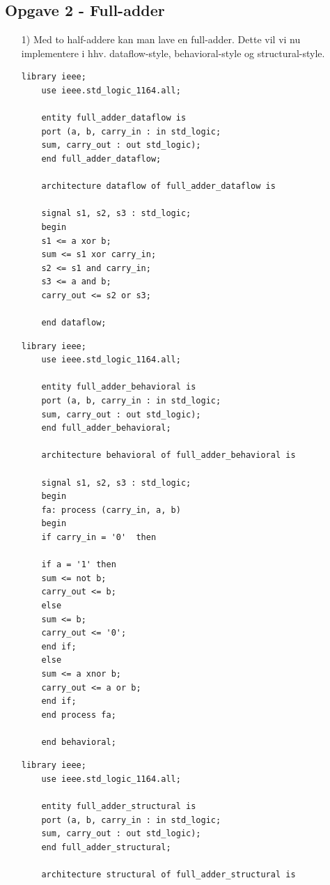 
\subsection{Opgave 2 - Full-adder}
	\flushleft
\begin{enumerate}
	\item[1)]
	Med to half-addere kan man lave en full-adder. Dette vil vi nu implementere i hhv. dataflow-style, behavioral-style og structural-style.\\
	\medskip
	\begin{lstlisting}[caption={Full-adder Dataflow VHDL kode},label={lst:FaDataflowCode}]
	library ieee;
	use ieee.std_logic_1164.all;
	
	entity full_adder_dataflow is
	port (a, b, carry_in : in std_logic;
	sum, carry_out : out std_logic);
	end full_adder_dataflow;
	
	architecture dataflow of full_adder_dataflow is
	
	signal s1, s2, s3 : std_logic;
	begin
	s1 <= a xor b; 
	sum <= s1 xor carry_in;
	s2 <= s1 and carry_in;
	s3 <= a and b;
	carry_out <= s2 or s3;
	
	end dataflow;
	\end{lstlisting}
	\medskip
	\begin{lstlisting}[caption={Full-adder Behavioral VHDL kode}, label={lst:FaBehavioralCode}]
	library ieee;
	use ieee.std_logic_1164.all;
	
	entity full_adder_behavioral is
	port (a, b, carry_in : in std_logic;
	sum, carry_out : out std_logic);
	end full_adder_behavioral;
	
	architecture behavioral of full_adder_behavioral is
	
	signal s1, s2, s3 : std_logic;
	begin
	fa: process (carry_in, a, b)
	begin
	if carry_in = '0'  then
	
	if a = '1' then
	sum <= not b;
	carry_out <= b;
	else
	sum <= b;
	carry_out <= '0';
	end if;
	else 
	sum <= a xnor b;
	carry_out <= a or b;
	end if;
	end process fa;
	
	end behavioral;
	\end{lstlisting}
	\medskip
	\begin{lstlisting}[caption={Full-adder Structural VHDL kode},label={lst:FaStructuralCode}]
	library ieee;
	use ieee.std_logic_1164.all;
	
	entity full_adder_structural is
	port (a, b, carry_in : in std_logic;
	sum, carry_out : out std_logic);
	end full_adder_structural;
	
	architecture structural of full_adder_structural is
	

\end{lstlisting}
\end{enumerate}
